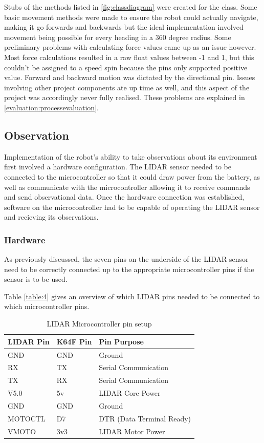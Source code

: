				Stubs of the methods listed in \ref{fig:classdiagram} were created for the class. Some basic movement methods were made to ensure the robot could actually navigate, making it go forwards and backwards but the ideal implementation involved movement being possible for every heading in a 360 degree radius. Some preliminary problems with calculating force values came up as an issue however. Most force calculations resulted in a raw float values between -1 and 1, but this couldn't be assigned to a speed spin because the pins only supported positive value. Forward and backward motion was dictated by the directional pin. Issues involving other project components ate up time as well, and this aspect of the project was accordingly never fully realised. These problems are explained in \ref{evaluation:processevaluation}.
				
			\subsection{Observation}
			Implementation of the robot's ability to take observations about its environment first involved a hardware configuration. The LIDAR sensor needed to be connected to the microcontroller so that it could draw power from the battery, as well as communicate with the microcontroller allowing it to receive commands and send observational data. Once the hardware connection was established, software on the microcontroller had to be capable of operating the LIDAR sensor and recieving its observations.
				\subsubsection{Hardware}
				As previously discussed, the seven pins on the underside of the LIDAR sensor need to be correctly connected up to the appropriate microcontroller pins if the sensor is to be used.
				
				Table \ref{table:4} gives an overview of which LIDAR pins needed to be connected to which microcontroller pins.
				
				\begin{table}[h!]
					\centering
					\begin{tabular}{|| l | l | l ||} 
						\hline
						LIDAR Pin & K64F Pin & Pin Purpose \\ [0.5ex] 
						\hline
						GND  & GND & Ground  \\ 
						RX  & TX  & Serial Communication \\
						TX  & RX & Serial Communication \\
						V5.0 & 5v & LIDAR Core Power \\ 
						GND & GND & Ground \\ 
						MOTOCTL & D7 & DTR (Data Terminal Ready) \\ 
						VMOTO & 3v3 & LIDAR Motor Power \\ [1ex] 
						\hline
					\end{tabular}
					\caption{LIDAR Microcontroller pin setup}
					\label{table:3}
				\end{table}
			
